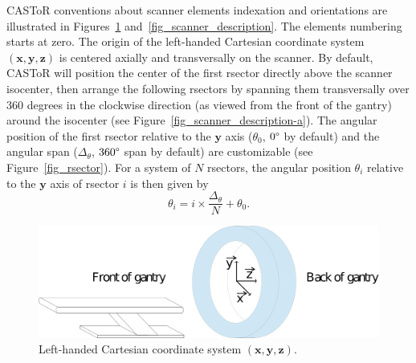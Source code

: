 \documentclass[a4paper, 11pt]{article}
\begin{document}
CASToR conventions about scanner elements indexation and orientations are illustrated in Figures~\ref{fig_scanner_axial_orientation} and~\ref{fig_scanner_description}. 
The elements numbering starts at zero.
The origin of the left-handed Cartesian coordinate system $(\mathbf{x,y,z})$ is centered axially and transversally on the scanner. 
By default, CASToR will position the center of the first rsector directly above the scanner isocenter, then arrange the following rsectors by spanning them
transversally over 360 degrees in the clockwise direction (as viewed from the front of the gantry) around the isocenter (see Figure~\ref{fig_scanner_description-a}).
The angular position of the first rsector relative to the ${\mathbf y}$ axis ($\theta_0$, $0\degree$ by default) and the angular span ($\Delta_{\theta}$, $360\degree$
span by default) are customizable (see Figure~\ref{fig_rsector}). 
For a system of $N$ rsectors, the angular position $\theta_i$ relative to the ${\mathbf y}$ axis of rsector $i$ is then given by
\begin{equation}
  \theta_i = i \times \frac{\Delta_{\theta}}{N} + \theta_0.
  \label{eq_rstorID}
\end{equation}

\begin{figure}
  \centerline{\includegraphics[width=0.6\columnwidth]{./figures/scanner_iso.pdf}}
  \caption{Left-handed Cartesian coordinate system $(\mathbf{x,y,z})$.}
  \label{fig_scanner_axial_orientation}
\end{figure}
\end{document}

